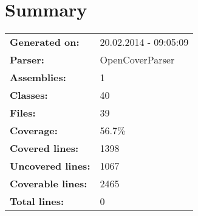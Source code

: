 \documentclass[a4paper,10pt]{article}
\begin{document}
\setcounter{secnumdepth}{-1}
\section{Summary}
\begin{longtable}[l]{ll}
\textbf{Generated on:} & 20.02.2014 - 09:05:09\\
\textbf{Parser:} & OpenCoverParser\\
\textbf{Assemblies:} & 1\\
\textbf{Classes:} & 40\\
\textbf{Files:} & 39\\
\textbf{Coverage:} & 56.7\%\\
\textbf{Covered lines:} & 1398\\
\textbf{Uncovered lines:} & 1067\\
\textbf{Coverable lines:} & 2465\\
\textbf{Total lines:} & 0\\
\end{longtable}
\end{document}
